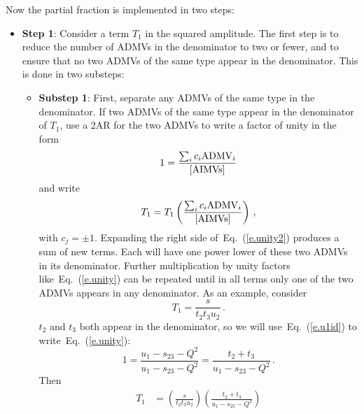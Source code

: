 \documentclass[prd,preprintnumbers,nofootinbib,superscriptaddress,onecolumn,preprint]{revtex4-1}
\newcommand\3[1]{\boldsymbol{#1}}
\newcommand{\parz}[1]{\ensuremath{\left(#1\right)}}
\newcommand{\eref}[1]{Eq.~(\ref{e.#1})}
\begin{document}
%
Now the partial fraction is implemented in two steps:
%
\begin{itemize}
\item[] \textbf{Step 1}: Consider a term $T_1$ in the squared amplitude.  The
      first step is to reduce the number of ADMVs in the denominator to two
      or fewer, and to ensure that no two ADMVs of the same type appear in
      the denominator. This is done in two substeps:
      \begin{itemize}
      \item[] \textbf{Substep 1}: First, separate any ADMVs of the same type in the
            denominator. If two ADMVs of the same type appear in the denominator
            of $T_1$, use a 2AR for the two ADMVs to write a factor of unity in
            the form
            \begin{equation} 
            1=\frac{\sum_i c_i {\rm ADMV}_i}{[{\rm AIMVs}]}
            \label{e.unity}
            \end{equation}
            and write
            \begin{equation} 
            T_1 = T_1 \parz{ \frac{\sum_i c_i {\rm ADMV}_i}{[{\rm AIMVs}]} } \, , 
            \label{e.unity2}
            \end{equation}
            with $c_j = \pm 1$. Expanding the right side of~\eref{unity2}
            produces a sum of new terms.  Each will have one power lower of these
            two ADMVs in its denominator.  Further multiplication by unity factors
            like~\eref{unity} can be repeated until in all terms only one of the
            two ADMVs appears in any denominator.  As an example, consider 
            \begin{equation}
            T_1 = \frac{s}{t_2 t_3 u_2} \, . 
            \end{equation}
            $t_2$ and $t_3$ both appear in the denominator,
            so we will use~\eref{u1id} to write~\eref{unity}:
            \begin{equation}
            1 = \frac{u_1 - s_{23} - Q^2}{u_1- s_{23} - Q^2} 
            = \frac{t_2 + t_3}{u_1- s_{23} - Q^2} \, .
            \end{equation}
            Then
            \begin{align}
            T_1 {}&= \parz{ \frac{s}{t_2 t_3 u _2} } 
                     \parz{\frac{t_2 + t_3}{u_1- s_{23} - Q^2}} \\

\end{align}
\end{itemize}
\end{itemize}
\end{document}
